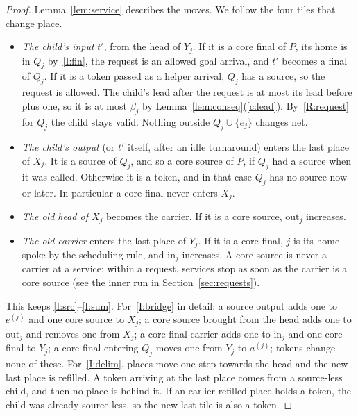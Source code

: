 \documentclass[11pt]{amsart}
\theoremstyle{definition}
\begin{document}
\begin{proof}
Lemma~\ref{lem:service} describes the moves. We follow the four tiles that change place.
\begin{itemize}[nosep]
\item \emph{The child's input} $t'$, from the head of $Y_j$. If it is a core final of $P$, its home is in $Q_j$ by~\ref{I:fin}, the
  request is an allowed goal arrival, and $t'$ becomes a final of $Q_j$. If it is a token passed as a helper arrival, $Q_j$ has a source,
  so the request is allowed. The child's lead after the request is at most its lead before plus one, so it is at most $\beta_j$
  by Lemma~\ref{lem:conseq}(\ref{c:lead}). By~\ref{R:request} for $Q_j$ the child stays valid. Nothing outside $Q_j\cup\{e_j\}$ changes net.
\item \emph{The child's output} (or $t'$ itself, after an idle turnaround) enters the last place of $X_j$. It is a source of $Q_j$, and so
  a core source of $P$, if $Q_j$ had a source when it was called. Otherwise it is a token, and in that case $Q_j$ has no source now or
  later. In particular a core final never enters $X_j$.
\item \emph{The old head of $X_j$} becomes the carrier. If it is a core source, $\mathrm{out}_j$ increases.
\item \emph{The old carrier} enters the last place of $Y_j$. If it is a core final, $j$ is its home spoke by the scheduling rule, and
  $\mathrm{in}_j$ increases. A core source is never a carrier at a service: within a request, services stop as soon as the carrier is a core source
  (see the inner run in Section~\ref{sec:requests}).
\end{itemize}
This keeps \ref{I:src}--\ref{I:sum}. For~\ref{I:bridge} in detail: a source output adds one to $e^{(j)}$ and one core source to
$X_j$; a core source brought from the head adds one to $\mathrm{out}_j$ and removes one from $X_j$; a core final carrier adds one to
$\mathrm{in}_j$ and one core final to $Y_j$; a core final entering $Q_j$ moves one from $Y_j$ to $a^{(j)}$; tokens change none of these.
For~\ref{I:delim}, places move one step towards the head and the new last place is refilled. A token arriving at the last place
comes from a source-less child, and then no place is behind it. If an earlier refilled place holds a token, the child was already
source-less, so the new last tile is also a token.


\end{proof}
\end{document}

